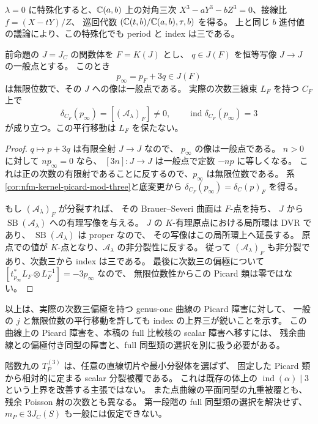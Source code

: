 $\lambda=0$ に特殊化すると、$\mathbb C(a,b)$ 上の対角三次
$X^3-aY^3-bZ^3=0$、接線比 $f=(X-tY)/Z$、
巡回代数 $(\mathbb C(t,b)/\mathbb C(a,b),\tau,b)$ を得る。
上と同じ $b$ 進付値の議論により、この特殊化でも period と index は三である。

\begin{corollary}[無限位数の平行移動にも残る障害]
\label{cor:nfm-picard-infinite-translation}
前命題の $J=J_C$ の関数体を $F=K(J)$ とし、
$q\in J(F)$ を恒等写像 $J\to J$ の一般点とする。
このとき
\[
 p_\infty=p_F+3q\in J(F)
\]
は無限位数で、その $J$ への像は一般点である。
実際の次数三線束 $L_F$ を持つ $C_F$ 上で
\[
 \delta_{C_F}(p_\infty)=[(\mathcal A_\lambda)_F]\ne0,\qquad
 \operatorname{ind}\delta_{C_F}(p_\infty)=3
\]
が成り立つ。この平行移動は $L_F$ を保たない。
\end{corollary}

\begin{proof}
$q\mapsto p+3q$ は有限全射 $J\to J$ なので、
$p_\infty$ の像は一般点である。
$n>0$ に対して $np_\infty=0$ なら、
$[3n]:J\to J$ は一般点で定数 $-np$ に等しくなる。
これは正の次数の有限射であることに反するので、$p_\infty$ は無限位数である。
系\ref{cor:nfm-kernel-picard-mod-three}と底変更から
$\delta_{C_F}(p_\infty)=\delta_C(p)_F$ を得る。

もし $(\mathcal A_\lambda)_F$ が分裂すれば、
その Brauer--Severi 曲面は $F$-点を持ち、
$J$ から $\operatorname{SB}(\mathcal A_\lambda)$ への有理写像を与える。
$J$ の $K$-有理原点における局所環は DVR であり、
$\operatorname{SB}(\mathcal A_\lambda)$ は proper なので、
その写像はこの局所環上へ延長する。
原点での値が $K$-点となり、$\mathcal A_\lambda$ の非分裂性に反する。
従って $(\mathcal A_\lambda)_F$ も非分裂であり、次数三から index は三である。
最後に次数三の偏極について
$[t_{p_\infty}^*L_F\otimes L_F^{-1}]=-3p_\infty$ なので、
無限位数性からこの Picard 類は零ではない。
\end{proof}

以上は、実際の次数三偏極を持つ genus-one 曲線の Picard 障害に対して、
一般の $j$ と無限位数の平行移動を許しても index の上界三が鋭いことを示す。
この曲線上の Picard 障害を、本稿の full 比較核の scalar 障害へ移すには、
残余曲線との偏極付き同型の障害と、full 同型類の選択を別に扱う必要がある。

階数九の $T_P^{(3)}$ は、任意の直線切片や最小分裂体を選ばず、
固定した Picard 類から相対的に定まる scalar 分裂被覆である。
これは既存の体上の $\operatorname{ind}(\alpha)\mid3$ という上界を改善する主張ではない。
また点曲線の平面同型の九重被覆とも、残余 Poisson 射の次数とも異なる。
第一段階の full 同型類の選択を解決せず、$m_P\in3J_C(S)$ も一般には仮定できない。

